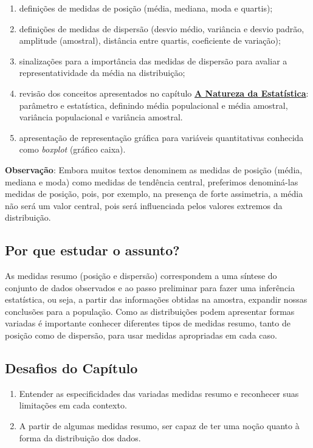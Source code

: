 \begin{apresentacao}
\begin{enumerate}
\item definições de medidas de posição (média, mediana, moda e quartis);
\item definições de medidas de dispersão (desvio médio, variância e desvio padrão, amplitude (amostral), distância entre quartis, coeficiente de variação);
\item sinalizações para a importância das medidas de dispersão para avaliar a representatividade da média na distribuição;
\item revisão dos conceitos apresentados no capítulo \hyperref[est1-chap]{\textbf{A Natureza da Estatística}}: parâmetro e estatística, definindo média populacional e média amostral, variância populacional e variância amostral.
\item apresentação de representação gráfica para variáveis quantitativas conhecida como \textit{boxplot} (gráfico caixa).
\end{enumerate}

\textbf{Observação}: Embora muitos textos denominem as medidas de posição (média, mediana e moda) como medidas de tendência central, preferimos denominá-las medidas de posição, pois, por exemplo, na presença de forte assimetria, a média não será um valor central, pois será influenciada pelos valores extremos da distribuição.

\subsection{Por que estudar o assunto?}

As medidas resumo (posição e dispersão) correspondem a uma síntese do conjunto de dados observados e ao passo preliminar para fazer uma inferência estatística, ou seja, a partir das informações obtidas na amostra, expandir nossas conclusões para a população. Como as distribuições podem apresentar formas variadas é importante conhecer diferentes tipos de medidas resumo, tanto de posição como de dispersão, para usar medidas apropriadas em cada caso.

\subsection{Desafios do Capítulo}

\begin{enumerate}
\item Entender as especificidades das variadas medidas resumo e reconhecer suas limitações em cada contexto.
\item A partir de algumas medidas resumo, ser capaz de ter uma noção quanto à forma da distribuição dos dados.
\end{enumerate}


\end{apresentacao}

